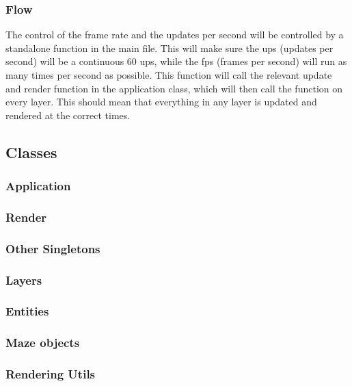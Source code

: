 \documentclass[../Main.tex]{subfiles}
\begin{document}
        \subsubsection{Flow}
            The control of the frame rate and the updates per second will be controlled by a standalone function in the main file. This will make sure the ups (updates per second) will be a continuous 60 ups, while the fps (frames per second) will run as many times per second as possible. This function will call the relevant update and render function in the application class, which will then call the function on every layer. This should mean that everything in any layer is updated and rendered at the correct times.
    \clearpage
    \subsection{Classes}
        \subsubsection{Application}
            
        \clearpage
        \subsubsection{Render}
            
        \clearpage
        \subsubsection{Other Singletons}
            
        \clearpage
        \subsubsection{Layers}
            
        \clearpage
        \subsubsection{Entities}
            
        \clearpage
        \subsubsection{Maze objects}
            
        \clearpage
        \subsubsection{Rendering Utils}
            
        \clearpage
\end{document}
